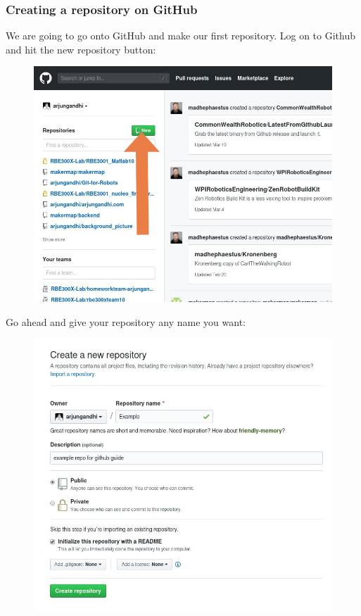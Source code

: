 \documentclass{article}
\begin{document}
\subsubsection{Creating a repository on GitHub}
We are going to go onto GitHub and make our first repository.
Log on to Github and hit the new repository button:
\begin{figure}[h]
    \centering
    \includegraphics[width=4.5in]{images/new-repo.jpg}
\end{figure}
\newline\newline
Go ahead and give your repository any name you want: 
\begin{figure}[h]
    \centering
    \includegraphics[width=4.5in]{images/new-repo2.jpg}
\end{figure}
\end{document}
